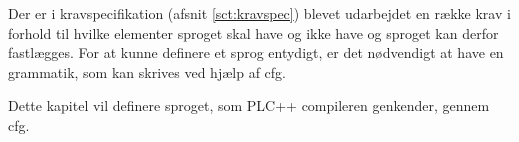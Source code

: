 Der er i kravspecifikation (afsnit \ref{sct:kravspec}) blevet udarbejdet en række krav i forhold til hvilke elementer sproget skal have og ikke have og sproget kan derfor fastlægges. For at kunne definere et sprog entydigt, er det nødvendigt at have en grammatik, som kan skrives ved hjælp af \gls{cfg}.

Dette kapitel vil definere sproget, som PLC++ compileren genkender, gennem \gls{cfg}.